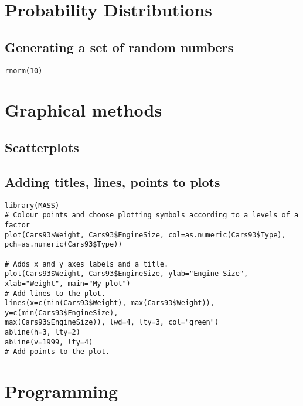 \begin{itemize}
\chapter{Probability Distributions}
\section{Generating a set of random numbers}

\large \begin{verbatim}
rnorm(10)
\end{verbatim}\large

\newpage
\chapter{Graphical methods}

\section{Scatterplots}


\section{Adding titles, lines, points to plots}


\large \begin{verbatim}
library(MASS)
# Colour points and choose plotting symbols according to a levels of a factor
plot(Cars93$Weight, Cars93$EngineSize, col=as.numeric(Cars93$Type),
pch=as.numeric(Cars93$Type))

# Adds x and y axes labels and a title.
plot(Cars93$Weight, Cars93$EngineSize, ylab="Engine Size",
xlab="Weight", main="My plot")
# Add lines to the plot.
lines(x=c(min(Cars93$Weight), max(Cars93$Weight)), y=c(min(Cars93$EngineSize),
max(Cars93$EngineSize)), lwd=4, lty=3, col="green")
abline(h=3, lty=2)
abline(v=1999, lty=4)
# Add points to the plot.
\end{verbatim}\large

\newpage
\chapter{Programming}








\end{itemize}
